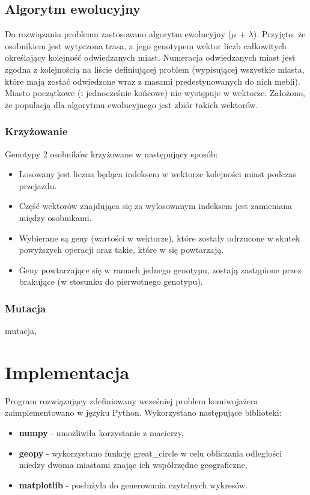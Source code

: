\documentclass[12pt, oneside, final]{report}
\begin{document}
\section{Algorytm ewolucyjny}
Do rozwiązania problemu zastosowano algorytm ewolucyjny ($\mu$ + $\lambda$). Przyjęto, że osobnikiem jest wytyczona trasa, a jego genotypem wektor liczb całkowitych określający kolejność odwiedzanych miast. Numeracja odwiedzanych miast jest zgodna z kolejnością na liście definiującej problem (wypisującej wszystkie miasta, które mają zostać odwiedzone wraz z masami predestynowanych do nich mebli). Miasto początkowe (i jednocześnie końcowe) nie występuje w wektorze. Założono, że populacją dla algorytmu ewolucyjnego jest zbiór takich wektorów.

\subsection{Krzyżowanie}
Genotypy 2 osobników krzyżowane w następujący sposób:
\begin{itemize}
\item Losowany jest liczna będąca indeksem w wektorze kolejności miast podczas przejazdu.
\item Część wektorów znajdująca się za wylosowanym indeksem jest zamieniana między osobnikami.
\item Wybierane są geny (wartości w wektorze), które zostały odrzucone w skutek powyższych operacji oraz takie, które w się powtarzają.
\item Geny powtarzające się w ramach jednego genotypu, zostają zastąpione przez brakujące (w stosunku do pierwotnego genotypu).
\end{itemize}

\subsection{Mutacja}
mutacja, %

\chapter{Implementacja}
Program rozwiązujący zdefiniowany wcześniej problem komiwojażera zaimplementowano w języku Python. Wykorzystano następujące biblioteki:
\begin{itemize}
\item \textbf{numpy} - umożliwiła korzystanie z macierzy,
\item \textbf{geopy} - wykorzystano funkcję great\_circle w celu obliczania odległości miedzy dwoma miastami znając ich współrzędne geograficzne,
\item \textbf{matplotlib} - posłużyła do generowania czytelnych wykresów.
\end{itemize}
\end{document}
